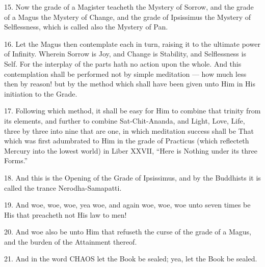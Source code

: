 15. Now the grade of a Magister teacheth the Mystery of Sorrow, and the grade of a Magus the Mystery of Change, and the grade of Ipsissimus the Mystery of Selflessness, which is called also the Mystery of Pan.
          
16. Let the Magus then contemplate each in turn, raising it to the ultimate power of Infinity. Wherein Sorrow is Joy, and Change is Stability, and Selflessness is Self. For the interplay of the parts hath no action upon the whole. And this contemplation shall be performed not by simple meditation --- how much less then by reason! but by the method which shall have been given unto Him in His initiation to the Grade.
          
17. Following which method, it shall be easy for Him to combine that trinity from its elements, and further to combine Sat-Chit-Ananda, and Light, Love, Life, three by three into nine that are one, in which meditation success shall be That which was first adumbrated to Him in the grade of Practicus (which reflecteth Mercury into the lowest world) in Liber XXVII, \enquote{Here is Nothing under its three Forms.}
          
18. And this is the Opening of the Grade of Ipsissimus, and by the Buddhists it is called the trance Nerodha-Samapatti.
          
19. And woe, woe, woe, yea woe, and again woe, woe, woe unto seven times be His that preacheth not His law to men!
          
20. And woe also be unto Him that refuseth the curse of the grade of a Magus, and the burden of the Attainment thereof.
          
21. And in the word CHAOS let the Book be sealed; yea, let the Book be sealed. 
